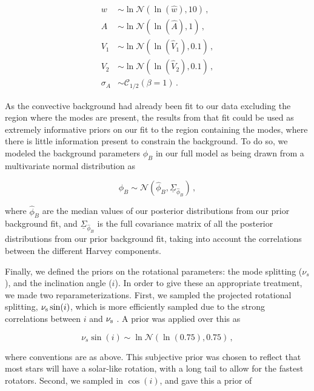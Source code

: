 \begin{equation}
	\begin{split}
		w &\sim \ln\mathcal{N}(\ln(\hat{w}), 10)\, ,\\
		A &\sim \ln\mathcal{N}(\ln(\hat{A}), 1)\, ,\\
		V_1 &\sim \ln\mathcal{N}(\ln(\hat{V}_1), 0.1)\, ,\\
		V_2 &\sim \ln\mathcal{N}(\ln(\hat{V}_2), 0.1)\, ,\\
		\sigma_A &\sim \mathcal{C}_{1/2}(\beta = 1)\, .
	\end{split}
\end{equation}

As the convective background had already been fit to our data excluding the region where the modes are present, the results from that fit could be used as extremely informative priors on our fit to the region containing the modes, where there is little information present to constrain the background. To do so, we modeled the background parameters $\phi_B$ in our full model as being drawn from a multivariate normal distribution as

\begin{equation}
	\phi_{B}\sim\mathcal{N}(\hat{\phi}_{B},\underline{\Sigma}_{\hat{\phi}_{B}})\, ,
\end{equation}

\noindent where $\hat{\phi}_B$ are the median values of our posterior distributions from our prior background fit, and $\underline{\Sigma}_{\hat{\phi}_{B}}$ is the full covariance matrix of all the posterior distributions from our prior background fit, taking into account the correlations between the different Harvey components.

Finally, we defined the priors on the rotational parameters: the mode splitting ($\nu_s$), and the inclination angle ($i$). In order to give these an appropriate treatment, we made two reparameterizations. First, we sampled the projected rotational splitting, $\nu_{\rm{s}}\sin(i)$, which is more efficiently sampled due to the strong correlations between $i$ and $\nu_{\rm s}$ \cite{ballot+2006,ballot+2008a}. A prior was applied over this as

\begin{equation}
	\nu_s\sin(i) \sim \ln\mathcal{N}(\ln(0.75), 0.75)\, ,
\end{equation}

\noindent where conventions are as above. This subjective prior was chosen to reflect that most stars will have a solar-like rotation, with a long tail to allow for the fastest rotators. Second, we sampled in $\cos(i)$, and gave this a prior of

